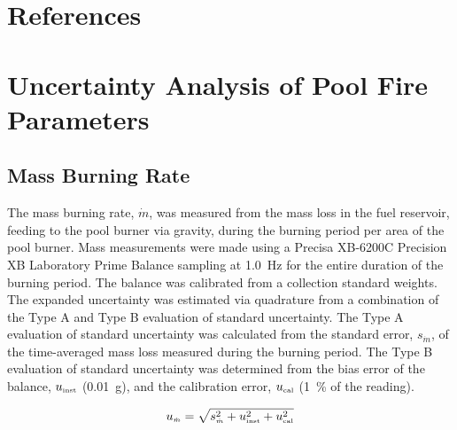 \documentclass[12pt]{article}
\begin{document}
\section*{References}


\pagebreak


\appendix
{}
\makeatletter
\newcommand{\section@cntformat}{Appendix:\ }
\makeatother

\section{Uncertainty Analysis of Pool Fire Parameters}\label{sec:Uncertainty_Pool_Fire_Parameters}

\subsection{Mass Burning Rate}
\label{ssec:Mass_Burning_Flux}
The mass burning rate, $\dot{m}$, was measured from the mass loss in the fuel reservoir, feeding to the pool burner via gravity, during the burning period per area of the pool burner. Mass measurements were made using a Precisa XB-6200C Precision XB Laboratory Prime Balance sampling at \SI{1.0}{\hertz} for the entire duration of the burning period. The balance was calibrated from a collection standard weights. The expanded uncertainty was estimated via quadrature from a combination of the Type A and Type B evaluation of standard uncertainty. The Type A evaluation of standard uncertainty was calculated from the standard error, $s_{\scriptscriptstyle \dot{m}}$, of the time-averaged mass loss measured during the burning period. The Type B evaluation of standard uncertainty was determined from the bias error of the balance, $u_{\rm \scriptscriptstyle inst}$ (\SI{0.01}{g}), and the calibration error, $u_{\rm \scriptscriptstyle cal}$ (1~\% of the reading).

\begin{equation}
\label{eq:mass_rate_uncertainty}
u_{\scriptscriptstyle \dot{m}} = \sqrt{s_{\scriptscriptstyle \dot{m}}^2+u_{\rm \scriptscriptstyle inst}^2+u_{\rm \scriptscriptstyle cal}^2}
\end{equation}
\end{document}
